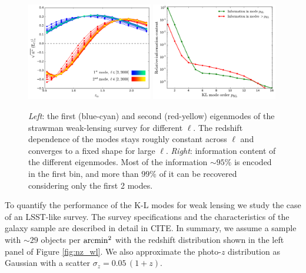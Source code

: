 \documentclass[twocolumn,amsfont,amssymb,amsmath, showpacs,balancelastpage, nofootinbib]{revtex4-1}
\begin{document}
    \begin{figure}
      \centering
      \includegraphics[width=0.49\textwidth]{Figs/kl_modes_wl}
      \includegraphics[width=0.49\textwidth]{Figs/information_wl}
      \caption{{\sl Left}: the first (blue-cyan) and second (red-yellow) eigenmodes of the strawman weak-lensing survey for different $\ell$. The redshift dependence of the modes stays roughly constant across $\ell$ and converges to a fixed shape for large $\ell$. {\sl Right}: information content of the different eigenmodes. Most of the information $\sim95\%$ is encoded in the first bin, and more than $99\%$ of it can be recovered considering only the first 2 modes.}\label{fig:kl_wl}
    \end{figure}
    To quantify the performance of the K-L modes for weak lensing we study the case of an LSST-like survey. The survey specifications and the characteristics of the galaxy sample are described in detail in CITE. In summary, we assume a sample with $\sim29$ objects per ${\rm arcmin}^2$ with the redshift distribution shown in the left panel of Figure \ref{fig:nz_wl}. We also approximate the photo-$z$ distribution as Gaussian with a scatter $\sigma_z=0.05\,(1+z)$.    
    
\end{document}
